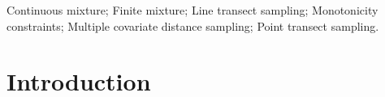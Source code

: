 \documentclass[useAMS,referee]{biom}
\begin{document}
%

\begin{keywords}
Continuous mixture; Finite mixture; Line transect sampling; Monotonicity constraints; Multiple covariate distance sampling; Point transect sampling.
\end{keywords}


\maketitle



%

\section{Introduction}
\label{s:intro}
\end{document}

